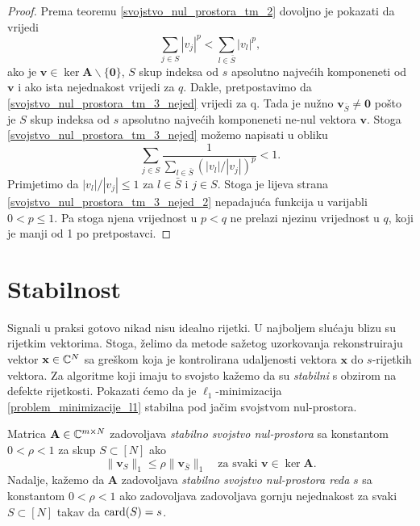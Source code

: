 \documentclass[a4paper,twoside,12pt]{memoir} %
\newcommand{\vect}[1]{\mathbf{#1}}
\renewcommand{\vec}{\vect}
\newcommand{\card}{\text{\normalfont{card}}}
\newcommand{\norm}[1]{\|{#1}\|}
\begin{document}
\begin{proof}
    Prema teoremu \ref{svojstvo_nul_prostora_tm_2} dovoljno je pokazati da vrijedi
    \begin{equation}\label{svojstvo_nul_prostora_tm_3_nejed}
        \sum_{j \in S} |v_j|^p < \sum_{l \in \bar S}|v_l|^p,
    \end{equation}
    ako je $\vec v \in \ker \vec A \backslash \{\vec 0\}$, $S$ skup indeksa od $s$ apsolutno najve\'cih komponeneti od $\vec v$ i ako ista nejednakost vrijedi za $q$.
    Dakle, pretpostavimo da \eqref{svojstvo_nul_prostora_tm_3_nejed} vrijedi za q. Tada je nu\v{z}no $\vec v_{\bar S} \neq \vec 0$ po\v{s}to je $S$ skup indeksa od $s$ apsolutno najve\'cih komponeneti ne-nul vektora $\vec v$. Stoga \eqref{svojstvo_nul_prostora_tm_3_nejed} mo\v{z}emo napisati u obliku
    \begin{equation}\label{svojstvo_nul_prostora_tm_3_nejed_2}
        \sum_{j \in S} \frac{1}{\sum_{l \in \bar S}(|v_l|/|v_j|)^p} < 1.  
    \end{equation}
    Primjetimo da $|v_l|/|v_j| \leq 1$ za $l \in \bar S$ i $j \in S$. Stoga je lijeva strana \eqref{svojstvo_nul_prostora_tm_3_nejed_2} nepadaju\'ca funkcija u varijabli $0<p \leq 1$. Pa stoga njena vrijednost u $p < q$ ne prelazi njezinu vrijednost u $q$, koji je manji od 1 po pretpostavci.
\end{proof}

\section[Stabilnost][Stabilnost]{Stabilnost}
Signali u praksi gotovo nikad nisu idealno rijetki. U najboljem slu\'caju blizu su rijetkim vektorima. Stoga, \v{z}elimo da metode sa\v{z}etog uzorkovanja rekonstruiraju vektor $\vec x \in \C^N$ sa gre\v{s}kom koja je kontrolirana udaljenosti vektora $\vec x$ do $s$-rijetkih vektora. Za algoritme koji imaju to svojsto ka\v{z}emo da su \textit{stabilni} s obzirom na defekte rijetkosti. Pokazati \'cemo da je $\ell_1$-minimizacija \eqref{problem_minimizacije_l1} stabilna pod ja\v{c}im svojstvom nul-prostora.

\begin{defn}
    Matrica $\vec A \in \C^{m \times N}$ zadovoljava \textit{stabilno svojstvo nul-prostora} sa konstantom $0<\rho<1$ za skup $S \subset [N]$ ako
    \begin{equation*}
        \norm{\vec v_S}_1 \leq \rho \norm{\vec v_{\bar S}}_1 \quad \text{za svaki }\vec v \in \ker \vec A.
    \end{equation*}
    Nadalje, ka\v{z}emo da $\vec A$ zadovoljava \textit{stabilno svojstvo nul-prostora reda} $s$ sa konstantom $0<\rho<1$ ako zadovoljava zadovoljava gornju nejednakost za svaki $S \subset [N]$ takav da $\card(S)=s$.
\end{defn}
\end{document}
